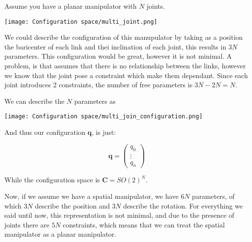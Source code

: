 \begin{example}
    Assume you have a planar manipulator with $N$ joints.

    \begin{center}
        \texttt{[image: Configuration space/multi\_joint.png]}
    \end{center}

    We could describe the configuration of this manupulator by taking as a position the baricenter of each link and thei inclination of each joint, this results in $3N$ parameters.
    This configuration would be great, however it is not minimal.
    A problem, is that assumes that there is no relationship between the links, however we know that the joint pose a constraint which make them dependant.
    Since each joint introduces 2 constraints, the number of free parameters is $3N-2N = N$.

    We can describe the $N$ parameters as

    \begin{center}
        \texttt{[image: Configuration space/multi\_join\_configuration.png]}
    \end{center}

    And thus our configuration $\bm{q}$, is just:

    $$
        \bm{q} = \begin{pmatrix}
            q_0    \\
            \vdots \\
            q_n
        \end{pmatrix}
    $$

    While the configuration space is $\mathbf{C} = SO(2)^N$.

    Now, if we assume we have a spatial manipulator, we have $6N$ parameters, of which $3N$ describe the position and $3N$ describe the rotation.
    For everything we said until now, this representation is not minimal, and due to the presence of joints there are $5N$ constraints, which means that we can treat the spatial manipulator as a planar manipulator.
\end{example}